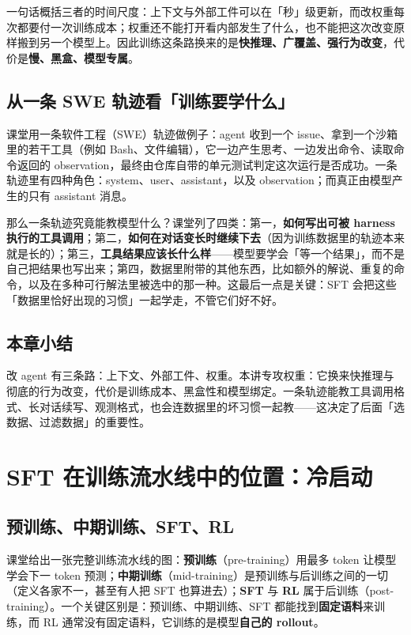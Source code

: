 \documentclass[a4paper]{article}
\begin{document}
一句话概括三者的时间尺度：上下文与外部工件可以在「秒」级更新，而改权重每次都要付一次训练成本；权重还不能打开看内部发生了什么，也不能把这次改变原样搬到另一个模型上。因此训练这条路换来的是\textbf{快推理、广覆盖、强行为改变}，代价是\textbf{慢、黑盒、模型专属}。

\subsection{从一条 SWE 轨迹看「训练要学什么」}

课堂用一条软件工程（SWE）轨迹做例子：agent 收到一个 issue、拿到一个沙箱里的若干工具（例如 Bash、文件编辑），它一边产生思考、一边发出命令、读取命令返回的 observation，最终由仓库自带的单元测试判定这次运行是否成功。一条轨迹里有四种角色：system、user、assistant，以及 observation；而真正由模型产生的只有 assistant 消息。

那么一条轨迹究竟能教模型什么？课堂列了四类：第一，\textbf{如何写出可被 harness 执行的工具调用}；第二，\textbf{如何在对话变长时继续下去}（因为训练数据里的轨迹本来就是长的）；第三，\textbf{工具结果应该长什么样}——模型要学会「等一个结果」，而不是自己把结果也写出来；第四，数据里附带的其他东西，比如额外的解说、重复的命令，以及在多种可行解法里被选中的那一种。这最后一点是关键：SFT 会把这些「数据里恰好出现的习惯」一起学走，不管它们好不好。

\subsection{本章小结}
改 agent 有三条路：上下文、外部工件、权重。本讲专攻权重：它换来快推理与彻底的行为改变，代价是训练成本、黑盒性和模型绑定。一条轨迹能教工具调用格式、长对话续写、观测格式，也会连数据里的坏习惯一起教——这决定了后面「选数据、过滤数据」的重要性。

\section{SFT 在训练流水线中的位置：冷启动}

\subsection{预训练、中期训练、SFT、RL}

课堂给出一张完整训练流水线的图：\textbf{预训练}（pre-training）用最多 token 让模型学会下一 token 预测；\textbf{中期训练}（mid-training）是预训练与后训练之间的一切（定义各家不一，甚至有人把 SFT 也算进去）；\textbf{SFT} 与 \textbf{RL} 属于后训练（post-training）。一个关键区别是：预训练、中期训练、SFT 都能找到\textbf{固定语料}来训练，而 RL 通常没有固定语料，它训练的是模型\textbf{自己的 rollout}。
\end{document}
